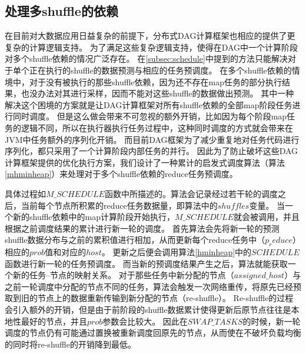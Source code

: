 \subsection{处理多shuffle的依赖}

在目前对大数据应用日益复杂的前提下，分布式DAG计算框架也相应的提供了更复杂的计算逻辑支持。
为了满足这些复杂逻辑支持，使得在DAG中一个计算阶段对多个shuffle依赖的情况广泛存在。
在\ref{subsec:schedule}中提到的方法只能解决对于单个正在执行的shuffle的数据预测与相应的任务预调度。
在多个shuffle依赖的情境中，对于没有被执行的那些shuffle依赖，因为还不存在map任务的部分执行结果，也没办法对其进行采样，因而不能对这些shuffle的数据做出预测。
其中一种解决这个困境的方案就是让DAG计算框架对所有shuffle依赖的全部map阶段任务进行同时调度。
但是这么做会带来不可忽视的额外开销，比如因为每个阶段map任务的逻辑不同，所以在执行器执行任务过程中，这种同时调度的方式就会带来在JVM中任务额外的序列化开销。
而目前DAG框架为了减少重复地对任务代码进行序列化，都只采用了一个计算阶段内部任务的并行。
因此为了防止破坏这些DAG计算框架提供的优化执行方案，我们设计了一种累计的启发式调度算法（算法\ref{mhminheap}）来处理对于多个shuffle依赖的reduce任务预调度。

具体过程如$M\_SCHEDULE$函数中所描述的。算法会记录经过若干轮的调度之后，当前每个节点所积累的reduce任务数据量，即算法中的$shuffles$变量。
当一个新的shuffle依赖中的map计算阶段开始执行，$M\_SCHEDULE$就会被调用，并且根据之前调度结果的累计进行新一轮的调度。
首先算法会先将新一轮的预测shuffle数据分布与之前的累积值进行相加，从而更新每个reduce任务中（$p_reduce$）相应的$prob$值和对应的$host$。
更新之后便会调用算法\ref{hminheap}中的$SCHEDULE$函数进行新一轮的任务预调度。
而当新的预调度结果产生之后，算法就能获取一个新的任务--节点的映射关系。
对于那些任务中新分配的节点（$assigned\_host$）与之前一轮调度中分配的节点不同的任务，算法会触发一次网络重传，将原先已经预取到旧的节点上的数据重新传输到新分配的节点（re-shuffle）。
Re-shuffle的过程会引入额外的开销，但是由于前阶段的shuffle数据累计使得更新后原节点往往是本地性最好的节点，并且$prob$参数会比较大。
因此在$SWAP\_TASKS$的时候，新一轮调度的节点仍有可能通过置换被重新调度回原先的节点，从而使在不破坏负载均衡的同时将re-shuffle的开销降到最低。


